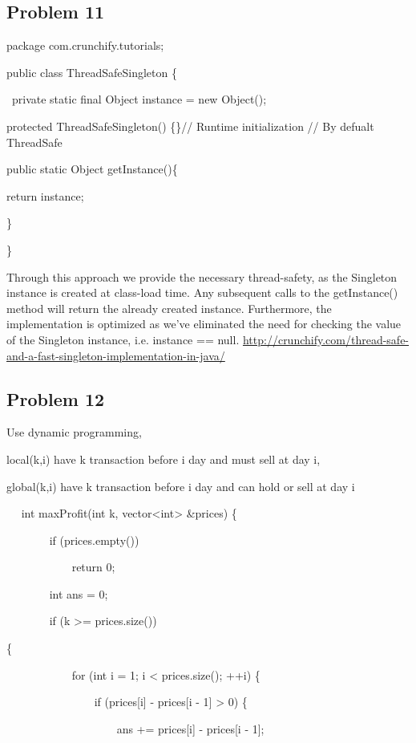 \documentclass[10pt]{article}
\begin{document}
\subsection*{Problem 11~}

package com.crunchify.tutorials;

\qquad public class ThreadSafeSingleton \{

~\qquad \qquad private static final Object instance = new Object();

\qquad \qquad  protected ThreadSafeSingleton() \{\}// Runtime initialization // By defualt ThreadSafe

\qquad
\qquad \qquad  public static Object getInstance()\{

\qquad \qquad \qquad return instance;

\qquad \qquad \}

\qquad \}

Through this approach we provide the necessary thread-safety, as the Singleton instance is created at class-load time. Any subsequent calls to the getInstance() method will return the already created instance. Furthermore, the implementation is optimized as we've eliminated the need for checking the value of the Singleton instance, i.e. instance == null. \href{http://crunchify.com/thread-safe-and-a-fast-singleton-implementation-in-java/}
{http://crunchify.com/thread-safe-and-a-fast-singleton-implementation-in-java/}

\subsection*{Problem 12~}
Use dynamic programming,

local(k,i) have k transaction before i day and must sell at day i,

global(k,i) have k transaction before i day and can hold or sell at day i

~~ int maxProfit(int k, vector<int> \&prices) \{

~~~~~~~ if (prices.empty())

~~~~~~~~~~~ return 0;

~~~~~~~ int ans = 0;

~~~~~~~ if (k >= prices.size())

\qquad \{

~~~~~~~~~~~ for (int i = 1; i < prices.size(); ++i) \{

~~~~~~~~~~~~~~~ if (prices[i] - prices[i - 1] > 0) \{

~~~~~~~~~~~~~~~~~~~ ans += prices[i] - prices[i - 1];
\end{document}
